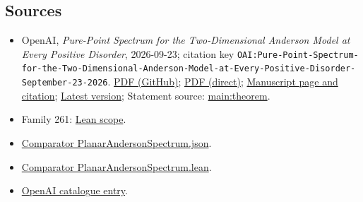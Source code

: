 \documentclass[11pt]{article}
\begin{document}
\subsection{Sources}
\begin{itemize}
\item OpenAI, \emph{Pure-Point Spectrum for the Two-Dimensional Anderson Model at Every Positive Disorder}, 2026-09-23; citation key \texttt{OAI:Pure-Point-Spectrum-for-the-Two-Dimensional-Anderson-Model-at-Every-Positive-Disorder-September-23-2026}. \href{https://github.com/openai/math/blob/adc7f1241b42e322a6451854ab7e4b4c146bf78a/preprints/Pure-Point-Spectrum-for-the-Two-Dimensional-Anderson-Model-at-Every-Positive-Disorder-September-23-2026/paper.pdf}{PDF (GitHub)}; \href{https://github.com/openai/math/raw/adc7f1241b42e322a6451854ab7e4b4c146bf78a/preprints/Pure-Point-Spectrum-for-the-Two-Dimensional-Anderson-Model-at-Every-Positive-Disorder-September-23-2026/paper.pdf}{PDF (direct)}; \href{https://github.com/openai/math/blob/adc7f1241b42e322a6451854ab7e4b4c146bf78a/preprints/Pure-Point-Spectrum-for-the-Two-Dimensional-Anderson-Model-at-Every-Positive-Disorder-September-23-2026/README.md}{Manuscript page and citation}; \href{https://github.com/openai/math/blob/main/preprints/Pure-Point-Spectrum-for-the-Two-Dimensional-Anderson-Model-at-Every-Positive-Disorder-September-23-2026/paper.pdf}{Latest version}; Statement source: \href{https://github.com/openai/math/blob/adc7f1241b42e322a6451854ab7e4b4c146bf78a/preprints/Pure-Point-Spectrum-for-the-Two-Dimensional-Anderson-Model-at-Every-Positive-Disorder-September-23-2026/build/sections/introduction.tex\#L19}{main:theorem}.
\item Family 261: \href{https://github.com/openai/math/blob/adc7f1241b42e322a6451854ab7e4b4c146bf78a/lean/docs/261.md}{Lean scope}.
\item \href{https://github.com/openai/math/blob/adc7f1241b42e322a6451854ab7e4b4c146bf78a/lean/ComparatorChallenges/PlanarAndersonSpectrum.json}{Comparator PlanarAndersonSpectrum.json}.
\item \href{https://github.com/openai/math/blob/adc7f1241b42e322a6451854ab7e4b4c146bf78a/lean/ComparatorChallenges/PlanarAndersonSpectrum.lean}{Comparator PlanarAndersonSpectrum.lean}.
\item \href{https://github.com/openai/math/blob/adc7f1241b42e322a6451854ab7e4b4c146bf78a/CONTENTS.md}{OpenAI catalogue entry}.
\end{itemize}
\end{document}
